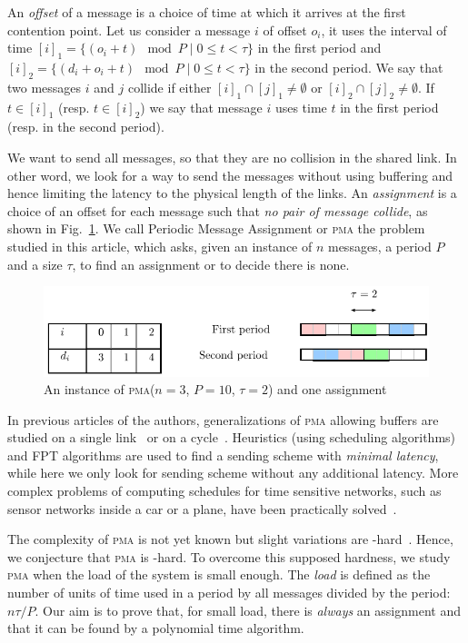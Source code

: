 \documentclass[10pt, conference, letterpaper]{algotel}
\newcommand\pma{\textsc{pma}\xspace}
\begin{document}
An \emph{offset} of a message is a choice of time at which it arrives
at the first contention point. Let us consider a message $i$
of offset $o_i$, it uses the interval of time $[i]_1 = \{ (o_i + t) \mod P \mid 0 \leq t < \tau \}$ in the first period and $[i]_2 = \{ (d_i + o_i + t) \mod P \mid 0 \leq t < \tau \}$ in the second period. We say that two messages $i$ and $j$ collide if either $[i]_1 \cap [j]_1 \neq \emptyset $ or $[i]_2 \cap [j]_2 \neq \emptyset $. If $t \in [i]_1$ (resp. $t \in [i]_2$) we say that message $i$ uses time $t$ in the first period (resp. in the second period).

We want to send all messages, so that they are no collision in the shared link.
In other word, we look for a way to send the messages without using buffering and 
hence limiting the latency to the physical length of the links. An \emph{assignment} is a
choice of an offset for each message such that \emph{no pair of message collide}, as shown in Fig.~\ref{fig:assignment}.  
We call Periodic Message Assignment or \pma the problem studied in this article,
which asks, given an instance of $n$ messages, a period $P$ and a size $\tau$, to find 
an assignment or to decide there is none.
\begin{figure}
\begin{center}
\includegraphics[scale=0.7]{instance}
\end{center}
\caption{An instance of \pma ($n=3$, $P= 10$, $\tau = 2$) and one assignment}
\label{fig:assignment}
\end{figure}
In previous articles of the authors, generalizations of \pma allowing buffers are studied on a single link~\cite{barth2018deterministic} or on a cycle~\cite{Guir1905:Deterministic}. Heuristics (using scheduling algorithms) and FPT algorithms are used to find a sending scheme with \emph{minimal latency}, while here we only look for sending scheme without any additional latency. More complex problems of computing schedules for time sensitive networks, such as sensor networks inside a car or a plane, have been practically solved~\cite{nayak2017incremental,steiner2018traffic}. 

The complexity of \pma is not yet known but slight variations are \NP-hard~\cite{barth2018deterministic}.  Hence, we conjecture that \pma is \NP-hard.
To overcome this supposed hardness, we study \pma when the load of the system is small enough. The \emph{load} is defined as the number of units of time used in a period by all messages divided by the period: $n\tau /P$. Our aim is to prove that, for small load, there is \emph{always} an assignment and that it can be found by a polynomial time algorithm.
\end{document}
